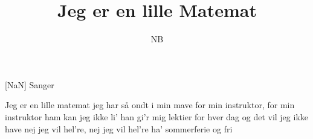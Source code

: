 \documentclass[a4paper,11pt]{article}
\title{Jeg er en lille Matemat}
\author{NB}
\begin{document}
\maketitle

\begin{roles}
[NaN] Sanger
\end{roles}

\begin{song}
 Jeg er en lille matemat
jeg har så ondt i min mave
for min instruktor, for min instruktor
ham kan jeg ikke li'
han gi'r mig lektier for hver dag
og det vil jeg ikke have
nej jeg vil hel're, nej jeg vil hel're
ha' sommerferie og fri
\end{song}
\end{document}
